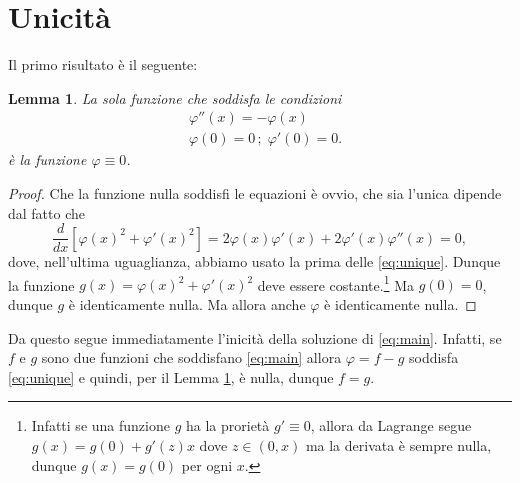 \documentclass{amsart}
\numberwithin{equation}{section}
\newtheorem{lem}[thm]{Lemma}
\newcommand\vf{\varphi}
\begin{document}
\section{Unicit\`a}
Il primo risultato \`e il seguente:
\begin{lem}\label{lem:unique}
La sola funzione che soddisfa le condizioni
\begin{equation}\label{eq:unique}
\begin{split}
&\vf''(x)=-\vf(x)\\
&\vf(0)=0\,;\;\vf'(0)=0.
\end{split}
\end{equation}
\`e la funzione $\vf\equiv 0$.
\end{lem}
\begin{proof}
Che la funzione nulla soddisfi le equazioni \`e ovvio, che sia l'unica dipende dal fatto che
\begin{equation}\label{eq:harm}
\frac{d}{dx}\left[\vf(x)^2+\vf'(x)^2\right]=2\vf(x)\vf'(x)+2\vf'(x)\vf''(x)=0,
\end{equation}
dove, nell'ultima uguaglianza, abbiamo usato la prima delle \eqref{eq:unique}.
Dunque la funzione $g(x)=\vf(x)^2+\vf'(x)^2$ deve essere costante.\footnote{Infatti se una funzione $g$ ha la proriet\`a $g'\equiv 0$, allora da Lagrange segue $g(x)=g(0)+g'(z)x$ dove $z\in(0,x)$ ma la derivata \`e sempre nulla, dunque $g(x)=g(0)$ per ogni $x$.} Ma $g(0)=0$, dunque $g$ \`e identicamente nulla. Ma allora anche $\vf$ \`e identicamente nulla.
\end{proof}
Da questo segue immediatamente l'inicit\`a della soluzione di \eqref{eq:main}. Infatti, se $f$ e $g$ sono due funzioni che soddisfano \eqref{eq:main} allora $\vf=f-g$ soddisfa \eqref{eq:unique} e quindi, per il Lemma \ref{lem:unique}, \`e nulla, dunque $f=g$.
\end{document}
